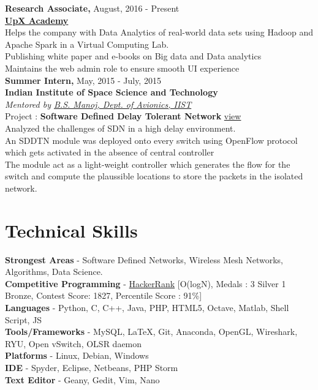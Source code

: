 \documentclass{resume}
\begin{document}
\begin{multicols}{2}
\noindent \textbf{Research Associate,} \hfill August, 2016 - Present\\
\href{http://upxacademy.com}{\textbf{UpX Academy}}\\
\textbullet \enspace Helps the company with Data Analytics of real-world data sets using Hadoop and Apache Spark in a Virtual Computing Lab.\\
\textbullet \enspace Publishing white paper and e-books on Big data and Data analytics\\
\textbullet \enspace Maintains the web admin role to ensure smooth UI experience \\

\noindent \textbf{Summer Intern,} \hfill May, 2015 - July, 2015\\
\textbf{Indian Institute of Space Science and Technology}\\
\emph{Mentored by \href{https://www.iist.ac.in/avionics/bsmanoj}{B.S. Manoj, Dept. of Avionics, IIST}}\\
Project : \textbf{Software Defined Delay Tolerant Network} \href{https://drive.google.com/open?id=0B7qfuVtugGPOZ2FURXNfaXlELXc}{view}\\
\textbullet \enspace Analyzed the challenges of SDN in a high delay environment.\\ 
\textbullet \enspace An SDDTN module was deployed onto every switch using OpenFlow protocol which gets activated in the absence of central controller\\
\textbullet \enspace The module act as a light-weight controller which generates the flow for the switch and compute the plaussible locations to store the packets in the isolated network. \\


\section{Technical Skills}

\textbf{Strongest Areas} - Software Defined Networks, Wireless Mesh Networks, Algorithms, Data Science.\\[.05in]
\textbf{Competitive Programming} - \href{https://www.hackerrank.com/amalrkrishna94}{HackerRank} [O(logN), Medals : 3 Silver 1 Bronze, Contest Score: 1827, Percentile Score : 91\%]\\[.05in]
\textbf{Languages} - Python, C, C++, Java, PHP, HTML5, Octave, Matlab, Shell Script, JS\\[.05in]
\textbf{Tools/Frameworks} - MySQL, \LaTeX, Git, Anaconda, OpenGL, Wireshark, RYU, Open vSwitch, OLSR daemon\\[.05in]
\textbf{Platforms} - Linux, Debian, Windows \\[.05in]
\textbf{IDE} - Spyder, Eclipse, Netbeans, PHP Storm\\[.05in]
\textbf{Text Editor} - Geany, Gedit, Vim, Nano\\[.05in]


\end{multicols}
\end{document}
